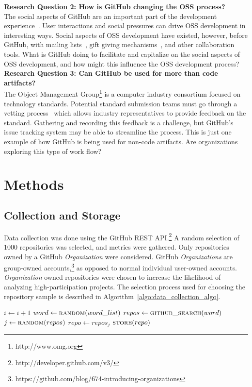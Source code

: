 \documentclass{proc}
\begin{document}
\noindent \textbf{Research Question 2: How is GitHub changing the OSS process?}\\
The social aspects of GitHub are an important part of the development experience~\cite{dabbish2012social}. User interactions and social pressures can drive OSS development in interesting ways. Social aspects of OSS development have existed, however, before GitHub, with mailing lists~\cite{mockus2000case}, gift giving mechanisms~\cite{bergquist2008power}, and other collaboration tools. What is GitHub doing to facilitate and capitalize on the social aspects of OSS development, and how might this influence the OSS development process?\\

\noindent \textbf{Research Question 3: Can GitHub be used for more than code artifacts?}\\
The Object Management Group\textsuperscript{\textregistered}\footnote{http://www.omg.org} is a computer industry consortium focused on technology standards. Potential standard submission teams must go through a vetting process~\cite{kobryn1999uml} which allows industry representatives to provide feedback on the standard. Gathering and recording this feedback is a challenge, but GitHub's issue tracking system may be able to streamline the process. This is just one example of how GitHub is being used for non-code artifacts. Are organizations exploring this type of work flow?

\section{Methods}
\subsection{Collection and Storage}
Data collection was done using the GitHub REST API.\footnote{http://developer.github.com/v3/} A random selection of 1000 repositories was selected, and metrics were gathered. Only repositories owned by a GitHub \textit{Organization} were considered. GitHub \textit{Organizations} are group-owned accounts,\footnote{https://github.com/blog/674-introducing-organizations} as opposed to normal individual user-owned accounts. \textit{Organization} owned repositories were chosen to increase the likelihood of analyzing high-participation projects. The selection process used for choosing the repository sample is described in Algorithm~\ref{algo:data_collection_algo}.

\begin{algorithm}[H]
\label{algo:data_collection_algo}
\begin{algorithmic}[1]
\State $i \gets i + 1$
\State $word \gets \textsc{random}(word\_list)$
\State $repos \gets \textsc{github\_search}(word)$
\State $j \gets \textsc{random}(repos)$
\State $repo \gets repos_j$
\State $\textsc{store}(repo)$
\EndIf 
\EndWhile
\end{algorithmic}
\end{algorithm}
\end{document}
